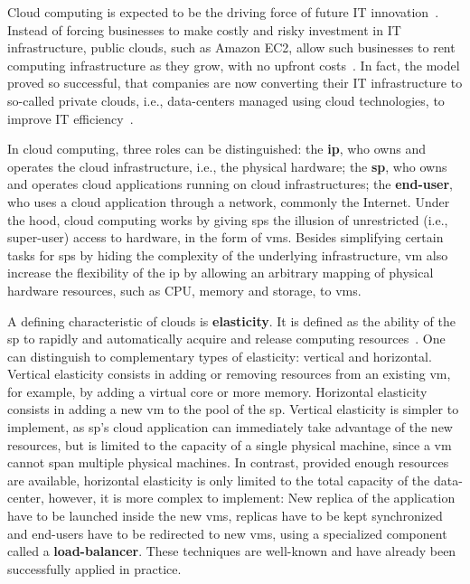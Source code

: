 Cloud computing is expected to be the driving force of future IT innovation~\cite{Gartner}. Instead of forcing businesses to make costly and risky investment in IT infrastructure, public clouds, such as Amazon EC2, allow such businesses to rent computing infrastructure as they grow, with no upfront costs~\cite{Buyya}. In fact, the model proved so successful, that companies are now converting their IT infrastructure to so-called private clouds, i.e., data-centers managed using cloud technologies, to improve IT efficiency~\cite{VMWare}.

In cloud computing, three roles can be distinguished: the {\bf\ac{ip}}, who owns and operates the cloud infrastructure, i.e., the physical hardware; the {\bf\ac{sp}}, who owns and operates cloud applications running on cloud infrastructures; the {\bf end-user}, who uses a cloud application through a network, commonly the Internet. Under the hood, cloud computing works by giving \acp{sp} the illusion of unrestricted (i.e., super-user) access to hardware, in the form of \acp{vm}. Besides simplifying certain tasks for \acp{sp} by hiding the complexity of the underlying infrastructure, \ac{vm} also increase the flexibility of the \ac{ip} by allowing an arbitrary mapping of physical hardware resources, such as CPU, memory and storage, to \acp{vm}.

A defining characteristic of clouds is {\bf elasticity}. It is defined as the ability of the \ac{sp} to rapidly and automatically acquire and release computing resources~\cite{ElasticityWhatItIs}. One can distinguish to complementary types of elasticity: vertical and horizontal. Vertical elasticity consists in adding or removing resources from an existing \ac{vm}, for example, by adding a virtual core or more memory. Horizontal elasticity consists in adding a new \ac{vm} to the pool of the \ac{sp}. Vertical elasticity is simpler to implement, as \ac{sp}'s cloud application can immediately take advantage of the new resources, but is limited to the capacity of a single physical machine, since a \ac{vm} cannot span multiple physical machines. In contrast, provided enough resources are available, horizontal elasticity is only limited to the total capacity of the data-center, however, it is more complex to implement: New replica of the application have to be launched inside the new \acp{vm}, replicas have to be kept synchronized and end-users have to be redirected to new \acp{vm}, using a specialized component called a {\bf load-balancer}. These techniques are well-known and have already been successfully applied in practice.

